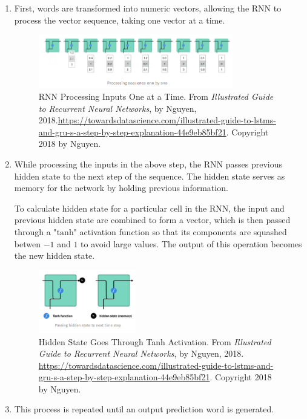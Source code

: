 \begin{enumerate}
    \item First, words are transformed into numeric vectors, allowing the RNN to process the vector sequence, taking one vector at a time. 
    
    \begin{figure}[h]
    \centering
    \includegraphics[width=0.8\textwidth]{imgs/rnn_step1.png}
    \caption{RNN Processing Inputs One at a Time. From \emph{Illustrated Guide to Recurrent Neural Networks}, by Nguyen, 2018.\url{https://towardsdatascience.com/illustrated-guide-to-lstms-and-gru-s-a-step-by-step-explanation-44e9eb85bf21}. Copyright 2018 by Nguyen.}
    \end{figure}
    
    \item While processing the inputs in the above step, the RNN passes previous hidden state to the next step of the sequence. The hidden state serves as memory for the network by holding previous information. 
    
    To calculate hidden state for a particular cell in the RNN, the input and previous hidden state are combined to form a vector, which is then passed through a $\text{"tanh"}$ activation function so that its components are squashed betwen $-1$ and $1$ to avoid large values. The output of this operation becomes the new hidden state. 
    
    \begin{figure}[h]
    \centering
    \includegraphics[width=0.4\textwidth]{imgs/rnn_step2.png}
    \caption{Hidden State Goes Through Tanh Activation. From \emph{Illustrated Guide to Recurrent Neural Networks}, by Nguyen, 2018. \url{https://towardsdatascience.com/illustrated-guide-to-lstms-and-gru-s-a-step-by-step-explanation-44e9eb85bf21}. Copyright 2018 by Nguyen.}
    \end{figure}
    
    \item This process is repeated until an output prediction word is generated. 
    
\end{enumerate}


